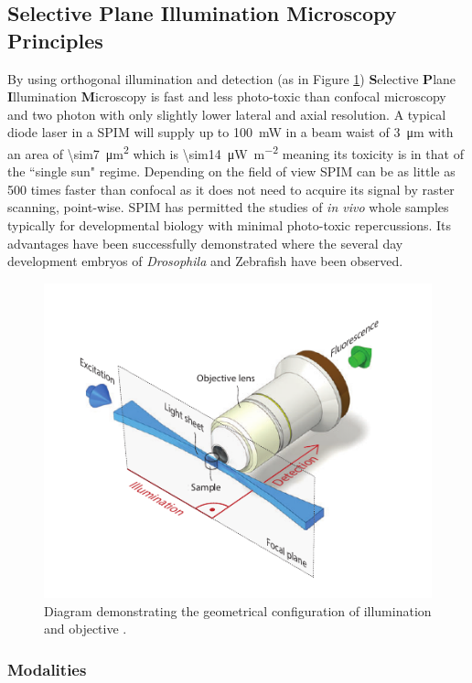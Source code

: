 \subsection{Selective Plane Illumination Microscopy Principles}
By using orthogonal illumination and detection (as in Figure \ref{fig:huisken_spim_setup}) \textbf{S}elective \textbf{P}lane \textbf{I}llumination \textbf{M}icroscopy is fast and less photo-toxic than confocal microscopy and two photon with only slightly lower lateral and axial resolution. A typical diode laser in a SPIM will supply up to \SI{100}{\milli\watt} in a beam waist of \SI{3}{\micro\meter}  with an area of \SI{\sim7}{\micro\meter\squared}  which is \SI{\sim14}{\micro\watt\per\meter\squared} meaning its toxicity is in that of the ``single sun" regime. Depending on the field of view SPIM can be as little as 500 times faster than confocal as it does not need to acquire its signal by raster scanning, point-wise. SPIM has permitted the studies of \textit{in vivo} whole samples typically for developmental biology \cite{Huisken2004,Verveer2007a} with minimal photo-toxic repercussions. Its advantages have been successfully demonstrated where the several day development embryos of \textit{Drosophila}  \cite{Huisken2004} and Zebrafish \cite{Mickoleit2014} have been observed.

\begin{figure}
\centering
\includegraphics[width=0.7\linewidth]{huisken_spim_setup}
\caption[Single Plane Imaging Microscope principle]{Diagram demonstrating the geometrical configuration of illumination and objective \cite{Huisken2009}.}
\label{fig:huisken_spim_setup}
\end{figure}

\subsubsection{Modalities}

